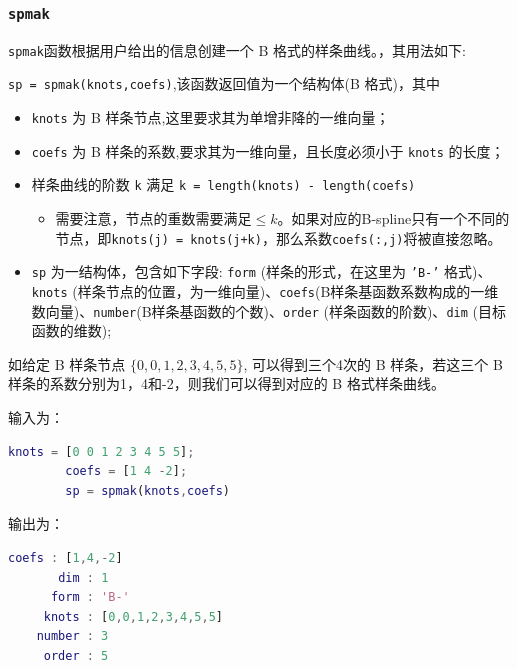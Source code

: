 \subsubsection{\texttt{spmak}}

\texttt{spmak}函数根据用户给出的信息创建一个 B 格式的样条曲线。，其用法如下:

\texttt{sp = spmak(knots,coefs)},该函数返回值为一个结构体(B 格式)，其中

\begin{itemize}
	\item \texttt{knots} 为 B 样条节点,这里要求其为单增非降的一维向量；
	\item \texttt{coefs} 为 B 样条的系数,要求其为一维向量，且长度必须小于 \texttt{knots} 的长度；
	\item 样条曲线的阶数 \texttt{k} 满足 \texttt{k = length(knots) - length(coefs)}
	\begin{itemize}
		\item 需要注意，节点的重数需要满足\texttt{$\leq k$}。如果对应的B-spline只有一个不同的节点，即\texttt{knots(j) = knots(j+k)}，那么系数\texttt{coefs(:,j)}将被直接忽略。
	\end{itemize}
	\item \texttt{sp} 为一结构体，包含如下字段: \texttt{form} (样条的形式，在这里为 \texttt{'B-'} 格式)、\texttt{knots} (样条节点的位置，为一维向量)、\texttt{coefs}(B样条基函数系数构成的一维数向量)、\texttt{number}(B样条基函数的个数)、\texttt{order} (样条函数的阶数)、\texttt{dim} (目标函数的维数);
\end{itemize}

如给定 B 样条节点 $\{0,0,1,2,3,4,5,5\}$, 可以得到三个4次的 B 样条，若这三个 B 样条的系数分别为1，4和-2，则我们可以得到对应的
B 格式样条曲线。
\par 输入为：
\begin{lstlisting}[language = matlab]
        knots = [0 0 1 2 3 4 5 5]; 
        coefs = [1 4 -2]; 
        sp = spmak(knots,coefs)
\end{lstlisting}

输出为：
\begin{lstlisting}[language = matlab ]
     coefs : [1,4,-2]
       dim : 1
      form : 'B-'
     knots : [0,0,1,2,3,4,5,5]
    number : 3
     order : 5
\end{lstlisting}
